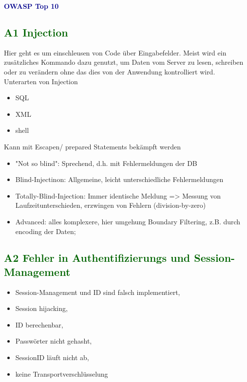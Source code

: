 \textbf{\textcolor{darkblue}{ OWASP Top 10}}~

\subsection*{\textcolor{darkgreen}{A1 Injection}}

Hier geht es um einschleusen von Code über Eingabefelder. Meist wird ein zusätzliches Kommando
dazu genutzt, um Daten vom Server zu lesen, schreiben oder zu verändern ohne das dies von
der Anwendung kontrolliert wird.
Unterarten von Injection
	\begin{itemize}
	\item SQL
	\item XML
	\item shell
	\end{itemize}
Kann mit Escapen/ prepared Statements bekämpft werden


\begin{itemize}
\item "Not so blind": Sprechend, d.h. mit Fehlermeldungen der DB
\item Blind-Injectinon: Allgemeine, leicht unterschiedliche Fehlermeldungen
\item Totally-Blind-Injection: Immer identische Meldung => Messung von Laufzeitunterschieden, erzwingen von Fehlern (division-by-zero)

\item Advanced: alles komplexere, hier umgehung Boundary Filtering, z.B. durch encoding der Daten;
\end{itemize}



\subsection*{\textcolor{darkgreen}{A2 Fehler in Authentifizierungs und Session-Management}}

	\begin{itemize}
	\item Session-Management und ID sind falsch implementiert,
	\item Session hijacking,
	\item ID berechenbar,
	\item Passwörter nicht gehasht,
	\item SessionID läuft nicht ab,
	\item keine Transportverschlüsselung
	\end{itemize}

